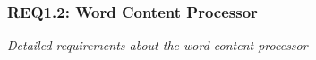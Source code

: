 \subsubsection{REQ1.2: Word Content Processor}

\textit{Detailed requirements about the word content processor}
